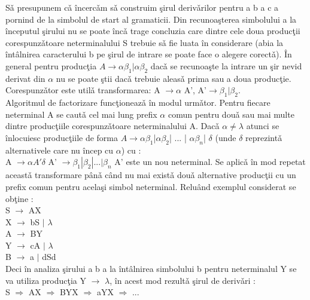 S\v a presupunem c\v a \^ incerc\v am s\v a construim \c sirul deriv\v arilor pentru a b a c a pornind de la simbolul de start al gramaticii. Din recunoa\c sterea simbolului a la \^ inceputul \c sirului nu se poate \^ inc\v a trage concluzia care dintre cele doua produc\c tii corespunz\v atoare neterminalului S trebuie s\v a fie luata \^ in considerare (abia la \^ int\^ alnirea caracterului b pe \c sirul de intrare se poate face o alegere corect\v a). \^In general pentru produc\c tia $A \rightarrow \alpha \beta_{1} | \alpha \beta_{2}$ dac\v a se recunoa\c ste la intrare un \c sir nevid derivat din $\alpha$ nu se poate \c stii dac\v a trebuie aleas\v a prima sau a doua produc\c tie. Corespunz\v ator este util\v a transformarea: A $\rightarrow \alpha$ A', A'$\rightarrow \beta_{1}|\beta_{2}$. \\
 Algoritmul de factorizare func\c tioneaz\v a \^ in modul urm\v ator. Pentru fiecare neterminal A se caut\v a cel mai lung prefix $\alpha$ comun pentru dou\v a sau mai multe dintre produc\c tiile corespunz\v atoare neterminalului A. Dac\v a $\alpha\neq \lambda $ atunci se \^ inlocuiesc produc\c tiile de forma $A \rightarrow \alpha \beta_{1}$|$ \alpha \beta_{2}$| ... | $\alpha \beta_{n}$| $\delta$ (unde $\delta$ reprezint\v a alternativele care nu \^ incep cu $\alpha$) cu : \\
A $\rightarrow \alpha A' \delta$
A' $\rightarrow \beta_{1}|\beta_{2}|...|\beta_{n}$
A' este un nou neterminal. Se aplic\v a \^ in mod repetat aceast\v a transformare p\^ an\v a c\^ and nu mai exist\v a dou\v a alternative produc\c tii cu un prefix comun pentru acela\c si simbol neterminal.
 Relu\^ and exemplul considerat se ob\c tine :\\
      S $\rightarrow$ AX \\
     X $\rightarrow$ bS $|$ $\lambda$\\
     A $\rightarrow$ BY \\
     Y $\rightarrow$ cA $|$ $\lambda$\\
      B $\rightarrow$ a $|$ dSd \\

Deci \^ in analiza \c sirului a b a la \^int\^ alnirea simbolului b pentru neterminalul Y se va utiliza produc\c tia Y $\rightarrow$ $\lambda$, \^ in acest mod rezult\v a \c sirul de deriv\v ari :\\
   S $\Rightarrow$ AX $\Rightarrow$ BYX  $\Rightarrow$ aYX $\Rightarrow$ ... 
 


